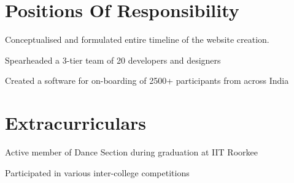 \documentclass[]{deedy-resume-openfont}
\begin{document}
\begin{minipage}[t]{0.66\textwidth}
\section{Positions Of Responsibility}
\begin{tightemize}
\item Conceptualised and formulated entire timeline of the website creation.
\item  Spearheaded a 3-tier team of 20 developers and designers
\item Created a software for on-boarding of 2500+ participants from across India
\end{tightemize}
\sectionsep


\section{Extracurriculars}
\begin{tightemize}
\item Active member of Dance Section during graduation at IIT Roorkee
\item Participated in various inter-college competitions
\end{tightemize}
\sectionsep




\end{minipage} 
\end{document}
